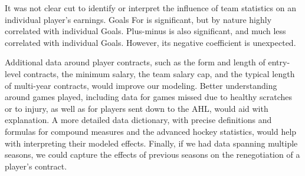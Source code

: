 \documentclass[10pt]{article}
\begin{document}
It was not clear cut to identify or interpret the influence of team statistics on an individual player’s earnings. Goals For is significant, but by nature highly correlated with individual Goals. Plus-minus is also significant, and much less correlated with individual Goals. However, its negative coefficient is unexpected.

Additional data around player contracts, such as the form and length of entry-level contracts, the minimum salary, the team salary cap, and the typical length of multi-year contracts, would improve our modeling. Better understanding around games played, including data for games missed due to healthy scratches or to injury, as well as for  players sent down to the AHL, would aid with explanation. A more detailed data dictionary, with precise definitions and formulas for compound measures and the advanced hockey statistics, would help with interpreting their modeled effects. Finally, if we had data spanning multiple seasons, we could capture the effects of previous seasons on the renegotiation of a player’s contract. 

% 
%
\end{document}
